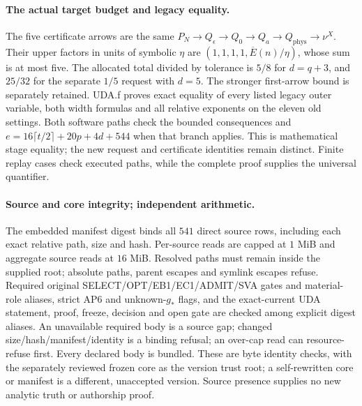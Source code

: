 \paragraph{The actual target budget and legacy equality.}
The five certificate arrows are the same
$P_N\to Q_\epsilon\to Q_0\to Q_a\to Q_{\mathrm{phys}}\to\nu^X$.
Their upper factors in units of symbolic $\eta$ are
$(1,1,1,1,\overline E(n)/\eta)$, whose sum is at most five.
The allocated total divided by tolerance is $5/8$ for $d=q+3$, and
$25/32$ for the separate $1/5$ request with $d=5$.
The stronger first-arrow bound is separately retained. UDA.f proves exact
equality of every listed legacy outer variable, both width formulas and all
relative exponents on the eleven old settings. Both software paths check the
bounded consequences and $e=16\lceil t/2\rceil+20p+4d+544$ when that
branch applies. This is mathematical stage equality; the new request and
certificate identities remain distinct. Finite replay cases check executed
paths, while the complete proof supplies the universal quantifier.

\paragraph{Source and core integrity; independent arithmetic.}
The embedded manifest digest binds all $541$ direct source rows, including
each exact relative path, size and hash. Per-source reads are capped at
$1$ MiB and aggregate source reads at $16$ MiB. Resolved paths must remain
inside the supplied root; absolute paths, parent escapes and symlink escapes
refuse. Required original SELECT/OPT/EB1/EC1/ADMIT/SVA gates and material-role
aliases, strict AP6 and unknown-$g_*$ flags, and the exact-current UDA
statement, proof, freeze, decision and open gate are checked among explicit
digest aliases. An unavailable required body is a source gap; changed
size/hash/manifest/identity is a binding refusal; an over-cap read can
resource-refuse first. Every declared body is bundled. These are byte
identity checks, with the separately reviewed frozen core as the version
trust root; a self-rewritten core or manifest is a different, unaccepted
version. Source presence supplies no new analytic truth or authorship proof.

